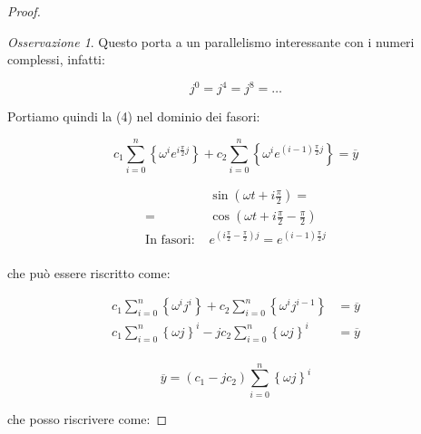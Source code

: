 \documentclass[11pt,italian]{article}
\theoremstyle{remark}
\newtheorem*{mdproposition}{Osservazione}
\newenvironment{remark}%
	{\begin{mdframed}[backgroundcolor=White]\begin{mdproposition}}%
	{\end{mdproposition}\end{mdframed}}
\begin{document}
\begin{proof}
\begin{remark}
        Questo porta a un parallelismo interessante con i numeri complessi, infatti:

        \[ j^0 = j^4 = j^8 = \dots\]
    \end{remark}

    Portiamo quindi la (4) nel dominio dei fasori:

    \begin{minipage}{0.65\textwidth}
        \begin{equation*}
            c_1 \sum_{i=0}^n \left\{ \omega^i e^{i\frac{\pi}{2} j} \right\} + c_2 \sum_{i=0}^n \left\{ \omega^i e^{{(i-1)}\frac{\pi}{2} j} \right\} = \overline{y}
        \end{equation*}
    \end{minipage}
    \begin{minipage}{0.35\textwidth}

        \begin{mdframed}[linecolor=CadetBlue]
            \color{CadetBlue}
            \small
            \begin{align*}
                                    &
                \sin\left( \omega t + i \frac{\pi}{2} \right) =                                                     \\
                =                   & \cos\left(\omega t + i \frac{\pi}{2} - \frac{\pi}{2}\right)                   \\
                \mbox{In fasori:\ } & e^{\left(i \frac{\pi}{2} - \frac{\pi}{2}\right) j} = e^{(i-1)\frac{\pi}{2} j} \\
            \end{align*}
        \end{mdframed}
    \end{minipage}


    che può essere riscritto come:

    \begin{align*}
        c_1 \sum_{i=0}^n \left\{ \omega^i j^i\right\} + c_2 \sum_{i=0}^n \left\{ \omega^i j^{i-1} \right\} & = \overline{y} \\
        c_1 \sum_{i=0}^n \left\{ \omega j \right\}^i  - j c_2 \sum_{i=0}^n \left\{ \omega j \right\}^{i}   & = \overline{y} \\
    \end{align*}

    \[
        \overline{y} = (c_1 - j c_2) \sum_{i=0}^n \left\{\omega j \right\}^i
    \]

    che posso riscrivere come:


\end{proof}
\end{document}

